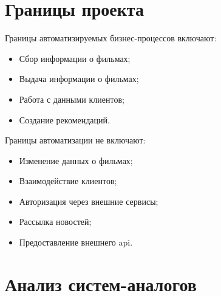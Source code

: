 \section{Границы проекта}

Границы автоматизируемых бизнес-процессов включают:

\begin{itemize}
	\item Сбор информации о фильмах;
	\item Выдача информации о фильмах;
	\item Работа с данными клиентов;
	\item Создание рекомендаций.
\end{itemize}

Границы автоматизации не включают:

\begin{itemize}
	\item Изменение данных о фильмах;
	\item Взаимодействие клиентов;
	\item Авторизация через внешние сервисы;
	\item Рассылка новостей;
	\item Предоставление внешнего api.
\end{itemize}

\section{Анализ систем-аналогов}

